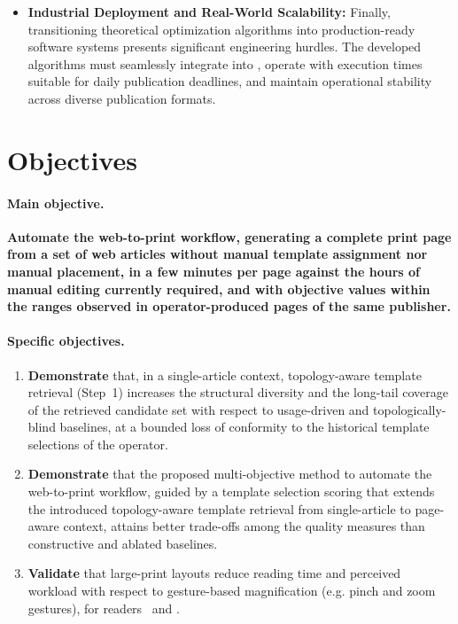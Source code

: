 \begin{itemize}
    \item \textbf{Industrial Deployment and Real-World Scalability:} Finally, transitioning theoretical optimization algorithms into production-ready software systems presents significant engineering hurdles. The developed algorithms must seamlessly integrate into \melody, operate with execution times suitable for daily publication deadlines, and maintain operational stability across diverse publication formats.
\end{itemize}

\section{Objectives}
\label{sec:objectives}

\paragraph{Main objective.} \textbf{Automate the \melody web-to-print workflow, generating a complete print page from a set of web articles without manual template assignment nor manual placement, in a few minutes per page against the hours of manual editing currently required, and with objective values within the ranges observed in operator-produced pages of the same publisher.}

\paragraph{Specific objectives.}

\begin{enumerate}

    \item \textbf{Demonstrate} that, in a single-article context, topology-aware template retrieval (Step~1) increases the structural diversity and the long-tail coverage of the retrieved candidate set with respect to usage-driven and topologically-blind baselines, at a bounded loss of conformity to the historical template selections of the operator.

    \item \textbf{Demonstrate} that the proposed multi-objective method to automate the \melody web-to-print workflow, guided by a template selection scoring that extends the introduced topology-aware template retrieval from single-article to page-aware context, attains better trade-offs among the quality measures than constructive and ablated baselines.

    \item \textbf{Validate} that large-print layouts reduce reading time and perceived workload with respect to gesture-based magnification (e.g. pinch and zoom gestures), for readers \NV\ and \LV.
\end{enumerate}

